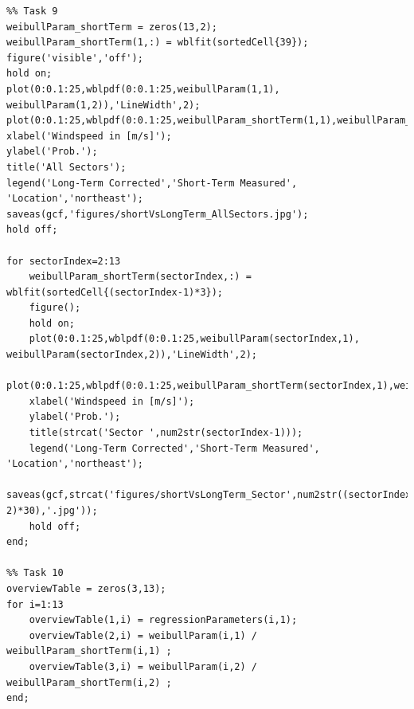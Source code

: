 \documentclass[10pt]{article}
\begin{document}
\begin{lstlisting}
%% Task 9
weibullParam_shortTerm = zeros(13,2);
weibullParam_shortTerm(1,:) = wblfit(sortedCell{39});
figure('visible','off');
hold on;
plot(0:0.1:25,wblpdf(0:0.1:25,weibullParam(1,1), weibullParam(1,2)),'LineWidth',2);
plot(0:0.1:25,wblpdf(0:0.1:25,weibullParam_shortTerm(1,1),weibullParam_shortTerm(1,2)),'LineWidth',2);
xlabel('Windspeed in [m/s]');
ylabel('Prob.');
title('All Sectors');
legend('Long-Term Corrected','Short-Term Measured', 'Location','northeast');
saveas(gcf,'figures/shortVsLongTerm_AllSectors.jpg');
hold off; 
    
for sectorIndex=2:13
    weibullParam_shortTerm(sectorIndex,:) = wblfit(sortedCell{(sectorIndex-1)*3});
    figure();
    hold on;
    plot(0:0.1:25,wblpdf(0:0.1:25,weibullParam(sectorIndex,1), weibullParam(sectorIndex,2)),'LineWidth',2);
    plot(0:0.1:25,wblpdf(0:0.1:25,weibullParam_shortTerm(sectorIndex,1),weibullParam_shortTerm(sectorIndex,2)),'LineWidth',2);
    xlabel('Windspeed in [m/s]');
    ylabel('Prob.');
    title(strcat('Sector ',num2str(sectorIndex-1)));
    legend('Long-Term Corrected','Short-Term Measured', 'Location','northeast');
    saveas(gcf,strcat('figures/shortVsLongTerm_Sector',num2str((sectorIndex-2)*30),'.jpg'));
    hold off; 
end;

%% Task 10
overviewTable = zeros(3,13);
for i=1:13
    overviewTable(1,i) = regressionParameters(i,1);
    overviewTable(2,i) = weibullParam(i,1) / weibullParam_shortTerm(i,1) ;
    overviewTable(3,i) = weibullParam(i,2) / weibullParam_shortTerm(i,2) ;
end;
\end{lstlisting}
\end{document}

